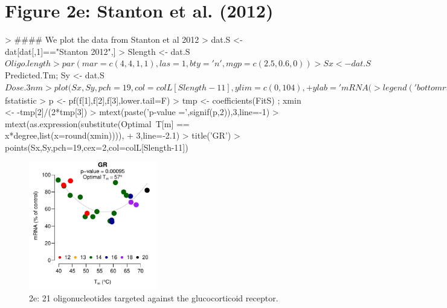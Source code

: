 \documentclass{article}
\newenvironment{Ncenter}{%
  \setlength\topsep{-10pt}
  \setlength\parskip{-100pt}
  \begin{center}
}{%
  \end{center}
}
\begin{document}
\section*{Figure 2e: Stanton et al. (2012)}
\begin{Schunk}
\begin{Sinput}
> #### We plot the data from Stanton et al 2012
> dat.S <- dat[dat[,1]=="Stanton 2012",]
> Slength <- dat.S$Oligo.length
> par(mar=c(4,4,1,1),las=1,bty='n',mgp=c(2.5,0.6,0))
> Sx <- dat.S$Predicted.Tm; Sy <- dat.S$Dose.3nm
> plot(Sx,Sy, pch=19,col=colL[Slength-11],ylim=c(0,104),
+      ylab='mRNA (%
> legend('bottomright',as.character(sort(unique(OLength))),
+        pch=19,col=colL[sort(unique(OLength))-11],bg='white',horiz=T,bty='n')
> FitS <- lm(Sy ~ Sx + I(Sx^2))
> Parfun <- function(D1){
+   tmp <- coefficients(FitS) 
+   tmp[1]+tmp[2]*D1+tmp[3]*D1^2}
> curve(Parfun(x),min(Sx),max(Sx), lwd=1,add=T,col='grey')
> f <- summary(FitS)$fstatistic
> p <- pf(f[1],f[2],f[3],lower.tail=F)
> tmp <- coefficients(FitS) ; xmin <- -tmp[2]/(2*tmp[3])
> mtext(paste('p-value =',signif(p,2)),3,line=-1)
> mtext(as.expression(substitute(Optimal~T[m] == x*degree,list(x=round(xmin)))),
+       3,line=-2.1)
> title('GR')
> points(Sx,Sy,pch=19,cex=2,col=colL[Slength-11])
\end{Sinput}
\end{Schunk}
\begin{figure}[!h]
\begin{Ncenter}
\includegraphics[width=0.5\textwidth]{Vignette2-Fig5}
\end{Ncenter}
\caption{2e: 21 oligonucleotides targeted against the glucocorticoid receptor.}
\end{figure}
\end{document}
